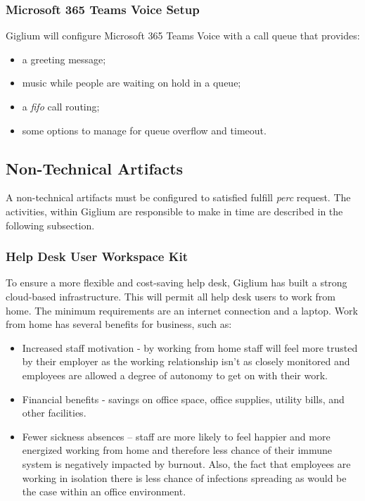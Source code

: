 \subsubsection{Microsoft 365 Teams Voice Setup}\label{365_setup}
Giglium will configure Microsoft 365 Teams Voice with a call queue that provides:

\begin{itemize}
	\item a greeting message;
	\item music while people are waiting on hold in a queue;
	\item a \textit{\gls{fifo}} call routing;
	\item some options to manage for queue overflow and timeout.
\end{itemize}

\subsection{Non-Technical Artifacts}\label{not_tecnical}
A non-technical artifacts must be configured to satisfied fulfill \textit{\gls{perc}} request. The activities, within Giglium are responsible to make in time are described in the following subsection.

\subsubsection{Help Desk User Workspace Kit}
To ensure a more flexible and cost-saving help desk, Giglium has built a strong cloud-based infrastructure. This will permit all help desk users to work from home. The minimum requirements are an internet connection and a laptop. Work from home has several benefits for business, such as:
\begin{itemize}
	\item Increased staff motivation {-} by working from home staff will feel more trusted by their employer as the working relationship isn't as closely monitored and employees are allowed a degree of autonomy to get on with their work.
	\item Financial benefits {-} savings on office space, office supplies, utility bills, and other facilities.
	\item Fewer sickness absences {–} staff are more likely to feel happier and more energized working from home and therefore less chance of their immune system is negatively impacted by burnout. Also, the fact that employees are working in isolation there is less chance of infections spreading as would be the case within an office environment.
\end{itemize}

